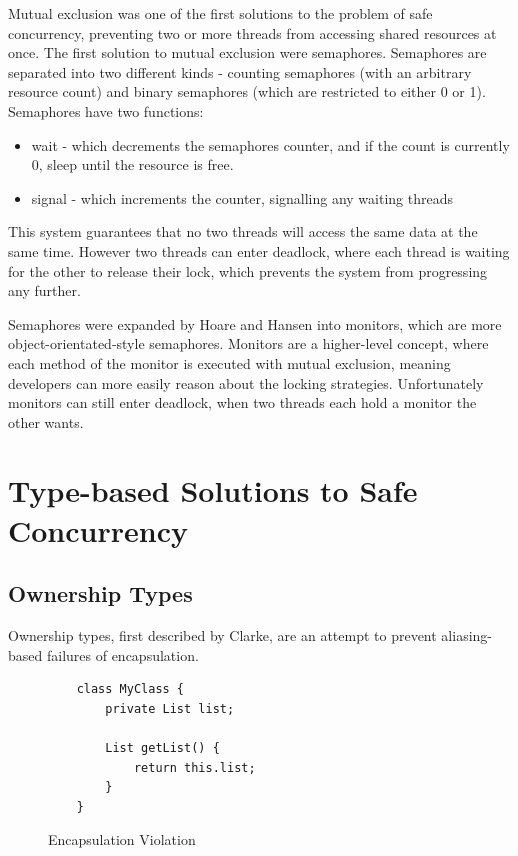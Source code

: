 \documentclass[11pt,a4paper]{report}
\begin{document}
Mutual exclusion was one of the first solutions to the problem of safe concurrency, preventing two or more threads from accessing shared resources at once.
The first solution to mutual exclusion were semaphores\cite{dijkstra-semaphore}.
Semaphores are separated into two different kinds - counting semaphores (with an arbitrary resource count) and binary semaphores (which are restricted to either 0 or 1).
Semaphores have two functions:
\begin{itemize}
	\item wait - which decrements the semaphores counter, and if the count is currently 0, sleep until the resource is free.
	\item signal - which increments the counter, signalling any waiting threads
\end{itemize}

This system guarantees that no two threads will access the same data at the same time.
However two threads can enter deadlock, where each thread is waiting for the other to release their lock, which prevents the system from progressing any further.

Semaphores were expanded by Hoare\cite{Hoare:1974:MOS:355620.361161} and Hansen\cite{hansen1975programming} into monitors, which are more object-orientated-style semaphores.
Monitors are a higher-level concept, where each method of the monitor is executed with mutual exclusion, meaning developers can more easily reason about the locking strategies.
Unfortunately monitors can still enter deadlock, when two threads each hold a monitor the other wants\cite{cooper1988preserving}.

\newpage
\section{Type-based Solutions to Safe Concurrency}

\subsection{Ownership Types}
\label{sec:ownership}

Ownership types, first described by Clarke\cite{clarke1998}, are an attempt to prevent aliasing-based failures of encapsulation.

\begin{figure}[H]
\begin{verbatim}
    class MyClass {
        private List list;

        List getList() {
            return this.list;
        }
    }
\end{verbatim}
\caption{Encapsulation Violation}
\label{fig:encapsulation}
\end{figure}
\end{document}
